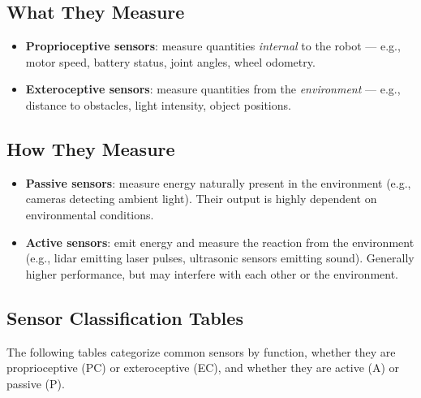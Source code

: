 \documentclass[11pt,a4paper]{article}
\theoremstyle{definition}
\theoremstyle{plain}
\theoremstyle{remark}
\begin{document}
\subsection{What They Measure}

\begin{itemize}
    \item \textbf{Proprioceptive sensors}: measure quantities \textit{internal} to the robot — e.g., motor speed, battery status, joint angles, wheel odometry.
    \item \textbf{Exteroceptive sensors}: measure quantities from the \textit{environment} — e.g., distance to obstacles, light intensity, object positions.
\end{itemize}

\subsection{How They Measure}

\begin{itemize}
    \item \textbf{Passive sensors}: measure energy naturally present in the environment (e.g., cameras detecting ambient light). Their output is highly dependent on environmental conditions.
    \item \textbf{Active sensors}: emit energy and measure the reaction from the environment (e.g., lidar emitting laser pulses, ultrasonic sensors emitting sound). Generally higher performance, but may interfere with each other or the environment.
\end{itemize}

\subsection{Sensor Classification Tables}

The following tables categorize common sensors by function, whether they are proprioceptive (PC) or exteroceptive (EC), and whether they are active (A) or passive (P).
\end{document}
